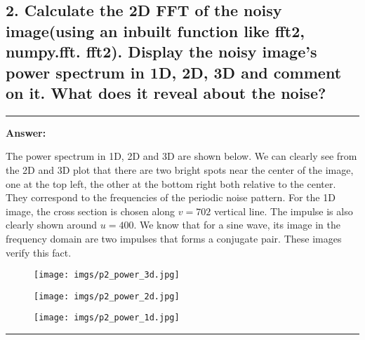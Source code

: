\documentclass[conference]{styles/acmsiggraph}
\newenvironment{answer}{}{}
\begin{document}
\subsection {2. Calculate the 2D FFT of the noisy image(using an inbuilt function like fft2, numpy.fft. fft2).
Display the noisy image’s power spectrum in 1D, 2D, 3D and comment on it. What does it reveal
about the noise?}
\begin{answer}
	\rule{\textwidth}{0.4pt}
	\textbf{Answer:}	
	
	The power spectrum in 1D, 2D and 3D are shown below. We can clearly see from the 2D and 3D plot that there are two bright spots near the center of the image, one at the top left, the other at the bottom right both relative to the center. They correspond to the frequencies of the periodic noise pattern. For the 1D image, the cross section is chosen along $v=702$ vertical line. The impulse is also clearly shown around $u=400$. We know that for a sine wave, its image in the frequency domain are two impulses that forms a conjugate pair. These images verify this fact.
	\begin{figure}[H]
		\centering
		\texttt{[image: imgs/p2\_power\_3d.jpg]}
	\end{figure}	
	\begin{figure}[H]
	\centering
	\texttt{[image: imgs/p2\_power\_2d.jpg]}
	\end{figure}	
	\begin{figure}[H]
	\centering
	\texttt{[image: imgs/p2\_power\_1d.jpg]}
	\end{figure}	

	\rule{\textwidth}{0.4pt}
\end{answer}
\end{document}
